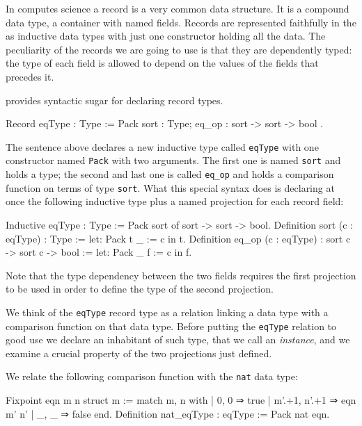 In computes science a record is a very common data structure.  It is a
compound data type, a container with named fields.  Records are
represented faithfully in the \mcbCIC{} as
inductive data types with just one constructor holding all the data.
The peculiarity of the records we are going to use is that they are
dependently typed: the type of each field is allowed to depend on
the values of the fields that precedes it.

\Coq{} provides syntactic sugar for declaring record types.

\begin{coq}{}
Record eqType : Type := Pack {
  sort : Type;
  eq_op : sort -> sort -> bool
}.
\end{coq}

The sentence above declares a new inductive type called
\lstinline/eqType/ with one constructor named
\lstinline/Pack/ with two arguments.  The first one
is named \lstinline/sort/ and holds a type; the second and last
one is called \lstinline/eq_op/ and holds a comparison function
on terms of type \lstinline/sort/.  What this special syntax
does is declaring at once the following inductive type plus
a named projection for each record field:

\begin{coq}{}
Inductive eqType : Type :=
  Pack sort of sort -> sort -> bool.
Definition sort (c : eqType) : Type :=
  let: Pack t _ := c in t.
Definition eq_op (c : eqType) : sort c -> sort c -> bool :=
  let: Pack _ f := c in f.
\end{coq}

Note that the type dependency between the two fields requires the first
projection to be used in order to define the type of the second projection.

We think of the \lstinline/eqType/ record type as a relation linking a
data type with a comparison function on that data type.  Before
putting the \lstinline/eqType/ relation to good use we declare an
inhabitant of such type, that we call an \emph{instance}, and we
examine a crucial property of the two projections just defined.

We relate the following comparison function with the \lstinline/nat/
data type: 

\begin{coq}{}
 Fixpoint eqn m n {struct m} :=
  match m, n with
  | 0, 0 ⇒ true
  | m'.+1, n'.+1 ⇒ eqn m' n'
  | _, _ ⇒ false
  end.
Definition nat_eqType : eqType := Pack nat eqn.
\end{coq}

